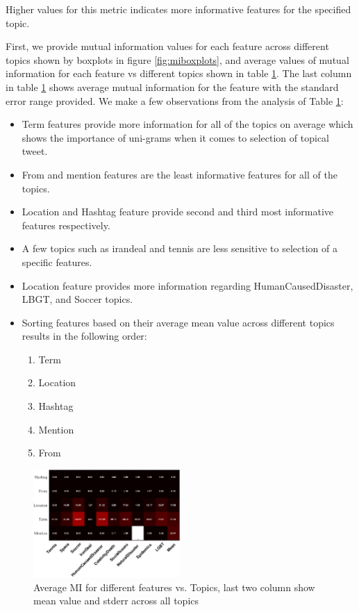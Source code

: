 \documentclass[letterpaper]{article}
\begin{document}
Higher values for this metric indicates more informative features for the specified topic.

First, we provide mutual information values for each feature across different topics shown by boxplots in figure \ref{fig:miboxplots}, and average values of mutual information for each feature vs different topics shown in table \ref{fig:table1}. The last column in table \ref{fig:table1} shows average mutual information for the feature with the standard error range provided. We make a few observations from the analysis of Table \ref{fig:table1}:

\begin{itemize}
\item Term features provide more information for all of the topics on average which shows the importance of uni-grams when it comes to selection of topical tweet.
\item From and mention features are the least informative features for all of the topics.
\item Location and Hashtag feature provide second and third most informative features respectively.
\item A few topics such as irandeal and tennis are less sensitive to selection of a specific features.
\item Location feature provides more information regarding HumanCausedDisaster, LBGT, and Soccer topics.
\item Sorting features based on their average mean value across different topics results in the following order:
\begin{enumerate}
\item Term
\item Location
\item Hashtag
\item Mention
\item From
\end{enumerate}
\end{itemize}

\iffalse
\begin{figure}[tbph!]
\centering
\includegraphics[width=0.5\textwidth]{images/avgMI.pdf}
\vspace{-3mm}
\caption{Average MI for different features vs. Topics, last two column show mean value and stderr across all topics}
\label{fig:table1}
\end{figure}
\end{document}
